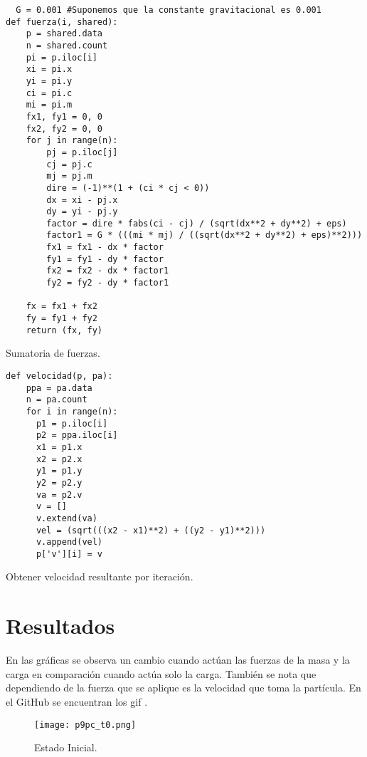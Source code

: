 \documentclass{article}
\begin{document}
\renewcommand{\listingscaption}{Código}
\begin{listing}[H]
  \begin{verbatim}
  G = 0.001 #Suponemos que la constante gravitacional es 0.001
def fuerza(i, shared):
    p = shared.data
    n = shared.count
    pi = p.iloc[i]
    xi = pi.x
    yi = pi.y
    ci = pi.c
    mi = pi.m
    fx1, fy1 = 0, 0
    fx2, fy2 = 0, 0
    for j in range(n):
        pj = p.iloc[j]
        cj = pj.c
        mj = pj.m
        dire = (-1)**(1 + (ci * cj < 0))
        dx = xi - pj.x
        dy = yi - pj.y
        factor = dire * fabs(ci - cj) / (sqrt(dx**2 + dy**2) + eps)
        factor1 = G * (((mi * mj) / ((sqrt(dx**2 + dy**2) + eps)**2)))
        fx1 = fx1 - dx * factor
        fy1 = fy1 - dy * factor
        fx2 = fx2 - dx * factor1
        fy2 = fy2 - dy * factor1
    
    fx = fx1 + fx2
    fy = fy1 + fy2
    return (fx, fy)
      \end{verbatim}
  \label{lst:fibo}
  \caption{Sumatoria de fuerzas.}
\end{listing}

\renewcommand{\listingscaption}{Código}
\begin{listing}[H]
  \begin{verbatim}
def velocidad(p, pa):
    ppa = pa.data
    n = pa.count
    for i in range(n):
      p1 = p.iloc[i]
      p2 = ppa.iloc[i]
      x1 = p1.x
      x2 = p2.x
      y1 = p1.y
      y2 = p2.y
      va = p2.v
      v = []
      v.extend(va)
      vel = (sqrt(((x2 - x1)**2) + ((y2 - y1)**2)))
      v.append(vel)
      p['v'][i] = v
      \end{verbatim}
  \label{lst:fibo}
  \caption{Obtener velocidad resultante por iteración.}
\end{listing}

\section{Resultados}

En las gráficas se observa un cambio cuando actúan las fuerzas de la masa y la carga en comparación cuando actúa solo la carga.  También se nota que dependiendo de la fuerza que se aplique es la velocidad que toma la partícula. En el GitHub se encuentran los gif \cite{Denisse_Leyva}.

\begin{figure}[H]
\centering
\texttt{[image: p9pc\_t0.png]}
\caption{\label{fig3} Estado Inicial.}
\end{figure}
\end{document}
